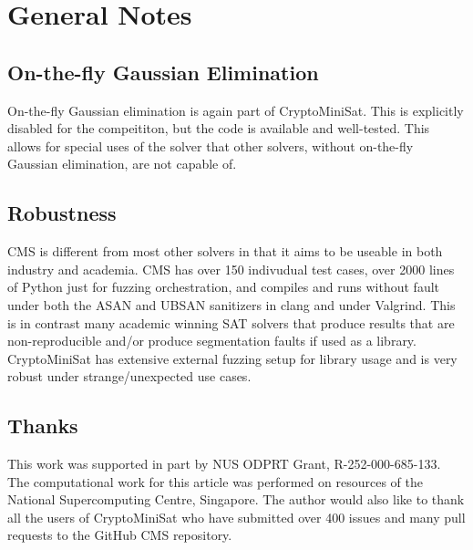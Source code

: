 \documentclass[final]{ieee}
\begin{document}
\section{General Notes}
\subsection{On-the-fly Gaussian Elimination}
On-the-fly Gaussian elimination is again part of CryptoMiniSat. This is explicitly disabled for the compeititon, but the code is available and well-tested. This allows for special uses of the solver that other solvers, without on-the-fly Gaussian elimination, are not capable of.

\subsection{Robustness}
CMS is different from most other solvers in that it aims to be useable in both industry and academia. CMS has over 150 indivudual test cases, over 2000 lines of Python just for fuzzing orchestration, and compiles and runs without fault under both the ASAN and UBSAN sanitizers in clang and under Valgrind. This is in contrast many academic winning SAT solvers that produce results that are non-reproducible and/or produce segmentation faults if used as a library. CryptoMiniSat has extensive external fuzzing setup for library usage and is very robust under strange/unexpected use cases.

\subsection{Thanks}
This work was supported in part by NUS ODPRT Grant, R-252-000-685-133. The computational work for this article was performed on resources of the National Supercomputing Centre, Singapore\cite{nscc}. The author would also like to thank all the users of CryptoMiniSat who have submitted over 400 issues and many pull requests to the GitHub CMS repository\cite{CMS}.





\vfill
\pagebreak
\end{document}
